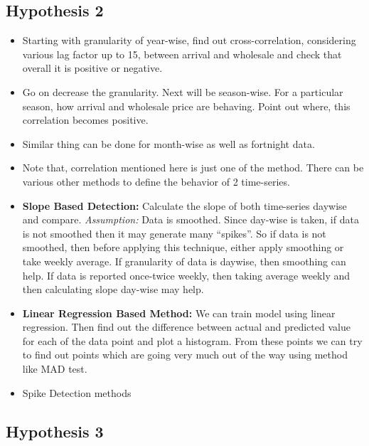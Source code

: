 \subsection{Hypothesis 2}

\begin{itemize}

\item Starting with granularity of year-wise, find out cross-correlation, considering various lag factor up to 15,  between arrival and wholesale and check that overall it is positive or negative.

\item Go on decrease the granularity. Next will be season-wise. For a particular season, how arrival and wholesale price are behaving. Point out where, this correlation becomes positive.

\item Similar thing can be done for month-wise as well as fortnight data.

\item Note that, correlation mentioned here is just one of the method. There can be various other methods to define the behavior of 2 time-series.

\item \textbf{Slope Based Detection:} Calculate the slope of both time-series daywise and compare. \textit{Assumption:} Data is smoothed. Since day-wise is taken, if data is not smoothed then it may generate many “spikes”. So if data is not smoothed, then before applying this technique, either apply smoothing or take weekly average. If granularity of data is daywise, then smoothing can help. If data is reported once-twice weekly, then taking average weekly and then calculating slope day-wise may help.

\item \textbf{Linear Regression Based Method:} We can train model using linear regression. Then find out the difference between actual and predicted value for each of the data point and plot a histogram. From these points we can try to find out points which are going very much out of the way using method like MAD test.

\item Spike Detection methods

\end{itemize}

\subsection{Hypothesis 3}

